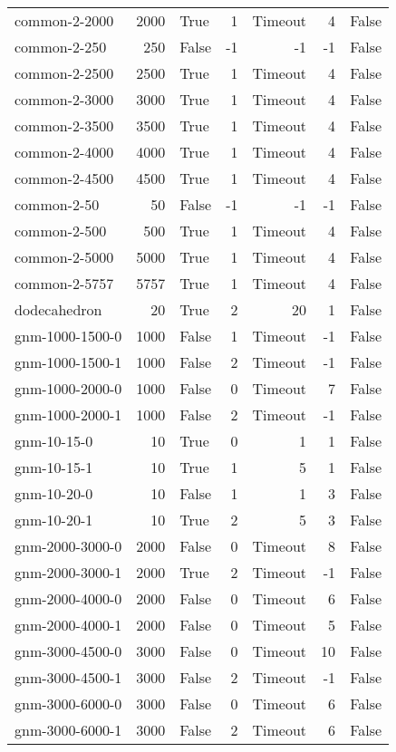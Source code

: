 \begin{longtable}{lrlrrrl}
common-2-2000 & 2000 & True & 1 & Timeout & 4 & False \\
common-2-250 & 250 & False & -1 & -1 & -1 & False \\
common-2-2500 & 2500 & True & 1 & Timeout & 4 & False \\
common-2-3000 & 3000 & True & 1 & Timeout & 4 & False \\
common-2-3500 & 3500 & True & 1 & Timeout & 4 & False \\
common-2-4000 & 4000 & True & 1 & Timeout & 4 & False \\
common-2-4500 & 4500 & True & 1 & Timeout & 4 & False \\
common-2-50 & 50 & False & -1 & -1 & -1 & False \\
common-2-500 & 500 & True & 1 & Timeout & 4 & False \\
common-2-5000 & 5000 & True & 1 & Timeout & 4 & False \\
common-2-5757 & 5757 & True & 1 & Timeout & 4 & False \\
dodecahedron & 20 & True & 2 & 20 & 1 & False \\
gnm-1000-1500-0 & 1000 & False & 1 & Timeout & -1 & False \\
gnm-1000-1500-1 & 1000 & False & 2 & Timeout & -1 & False \\
gnm-1000-2000-0 & 1000 & False & 0 & Timeout & 7 & False \\
gnm-1000-2000-1 & 1000 & False & 2 & Timeout & -1 & False \\
gnm-10-15-0 & 10 & True & 0 & 1 & 1 & False \\
gnm-10-15-1 & 10 & True & 1 & 5 & 1 & False \\
gnm-10-20-0 & 10 & False & 1 & 1 & 3 & False \\
gnm-10-20-1 & 10 & True & 2 & 5 & 3 & False \\
gnm-2000-3000-0 & 2000 & False & 0 & Timeout & 8 & False \\
gnm-2000-3000-1 & 2000 & True & 2 & Timeout & -1 & False \\
gnm-2000-4000-0 & 2000 & False & 0 & Timeout & 6 & False \\
gnm-2000-4000-1 & 2000 & False & 0 & Timeout & 5 & False \\
gnm-3000-4500-0 & 3000 & False & 0 & Timeout & 10 & False \\
gnm-3000-4500-1 & 3000 & False & 2 & Timeout & -1 & False \\
gnm-3000-6000-0 & 3000 & False & 0 & Timeout & 6 & False \\
gnm-3000-6000-1 & 3000 & False & 2 & Timeout & 6 & False \\

\end{longtable}
